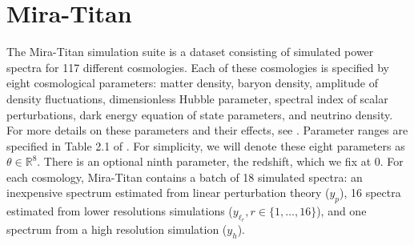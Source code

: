 \documentclass[11pt]{article}
\begin{document}


\section{Mira-Titan}
\label{sec:data}

The Mira-Titan simulation suite is a dataset consisting of simulated power spectra for 
117 different cosmologies. Each of these cosmologies is specified by eight cosmological 
parameters: matter density, baryon density, amplitude of density fluctuations, 
dimensionless Hubble parameter, spectral index of scalar perturbations,
dark energy equation of state parameters, and neutrino density. For more details 
on these parameters and their effects, see \cite{dodelson2020modern, aghanim2020planck, heitmann2016mira}. 
Parameter ranges are specified in Table 2.1 of \cite{moran2023mira}.
For simplicity, we will denote these eight parameters as $\theta \in \mathbb{R}^8$. 
There is an optional ninth parameter, the redshift, which we fix at 0.
For each cosmology, Mira-Titan contains a batch of 18 simulated spectra: an inexpensive 
spectrum estimated from linear perturbation theory ($y_p$), 16 spectra estimated from 
lower resolutions simulations ($y_{\ell_r}, r \in \{1,\dots,16\}$), and one spectrum from 
a high resolution simulation ($y_h$). 
\end{document}
